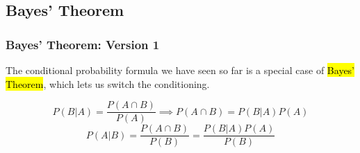 \documentclass[slidestop,compress,mathserif]{beamer}
\makeatletter
\newcommand{\soln}[1]{\textit{#1}}
\newcommand{\solnGr}[1]{#1}
\def\chp3@path{../../Chp 3}
\makeatother
\begin{document}











\subsection{Bayes' Theorem}


\begin{frame}
\frametitle{Bayes' Theorem: Version 1}

The conditional probability formula we have seen so far is a special case of \hl{Bayes' Theorem}, which lets us switch the conditioning.

\vspace{2mm}
\[
P(B|A) = \frac{P(A \cap B)}{P(A)} \implies P(A \cap B) = P(B|A)P(A)
\]
\pause
\[
P(A|B) = \frac{P(A \cap B)}{P(B)} = \frac{P(B|A)P(A)}{P(B)}
\]

\pause
\vspace{2mm}


\end{frame}
\end{document}
